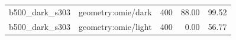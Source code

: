 \begin{longtable}{l>{\raggedright\arraybackslash}p{.42\linewidth}rrr}
b500\_\allowbreak{}dark\_\allowbreak{}s303 & %
geometry:omie/dark & %
400 & %
88.00 & %
99.52 \\ %

b500\_\allowbreak{}dark\_\allowbreak{}s303 & %
geometry:omie/light & %
400 & %
0.00 & %
56.77 \\ %


\end{longtable}

